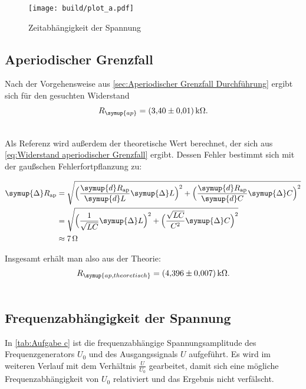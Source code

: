 \begin{figure} [H]
  \centering
  \texttt{[image: build/plot\_a.pdf]}
  \caption{Zeitabhängigkeit der Spannung}
  \label{fig:plot_a}
\end{figure}

\subsection{Aperiodischer Grenzfall}
\label{sec:Aperiodischer Grenzfall}

Nach der Vorgehensweise aus \autoref{sec:Aperiodischer Grenzfall Durchführung} ergibt sich für den gesuchten Widerstand \\
\begin{gather*}
  R_{\symup{ap}} = \qty{3,40+-0.01}{\kilo\ohm}. \\ \notag
\end{gather*}

Als Referenz wird außerdem der theoretische Wert berechnet, der sich aus \eqref{eq:Widerstand aperiodischer Grenzfall} ergibt.
Dessen Fehler bestimmt sich mit der gaußschen Fehlerfortpflanzung zu:

\begin{align*}
  \label{eqn:Fehler Rap}
  \symup{\Delta} R_{\text{ap}} &= \sqrt{\Bigl(\frac{\symup{d}R_{\text{ap}}}{\symup{d}L}\symup{\Delta} L \Bigr)^2+\Bigl(\frac{\symup{d}R_{\text{ap}}}{\symup{d}C}\symup{\Delta} C\Bigr)^2} \\
  &= \sqrt{\Bigl(\frac{1}{\sqrt{LC}}\symup{\Delta} L\Bigr)^2+\Bigl(\frac{\sqrt{LC}}{C^2}\symup{\Delta} C\Bigr)^2} \\
  &\approx 7\,\unit{\ohm}
\end{align*}

Insgesamt erhält man also aus der Theorie:
\begin{gather*}
  R_{\symup{ap, theoretisch}} = \qty{4,396+-0.007}{\kilo\ohm}. \\ \notag
\end{gather*}

\subsection{Frequenzabhängigkeit der Spannung}
\label{sec:Frequenzabhängigkeit der Spannung}

In \autoref{tab:Aufgabe c} ist die frequenzabhängige Spannungsamplitude des Frequenzgenerators $U_0$ und des Ausgangssignals $U$
aufgeführt. Es wird im weiteren Verlauf mit dem Verhältnis $\frac{U}{U_{0}}$ gearbeitet, damit sich eine mögliche
Frequenzabhängigkeit von $U_0$ relativiert und das Ergebnis nicht verfälscht. 

